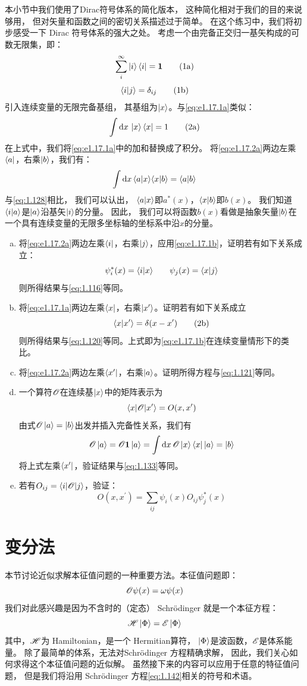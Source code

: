 { 本小节中我们使用了Dirac符号体系的简化版本，
 这种简化相对于我们的目的来说够用，
 但对矢量和函数之间的密切关系描述过于简单。
 在这个练习中，我们将初步感受一下 Dirac 符号体系的强大之处。
 考虑一个由完备正交归一基矢构成的可数无限集，即：
\[
     \sum_i^\infty \Ket{i}\Bra{i} = \mathbf{1}
     \tag{1a}\label{eq:e1.17.1a}
\]
\[
     \langle i \vert j \rangle = \delta_{ij}
     \tag{1b}\label{eq:e1.17.1b}
\]
引入连续变量的无限完备基组，
其基组为$\Ket{x}$。与\autoref{eq:e1.17.1a}类似：
\[
\int\mathrm{d}x\,\Ket{x}\Bra{x} = 1
\tag{2a}\label{eq:e1.17.2a}
\]
在上式中，我们将\autoref{eq:e1.17.1a}中的加和替换成了积分。
将\autoref{eq:e1.17.2a}两边左乘$\Bra{a}$，右乘$\Ket{b}$，我们有：
\[
\int\mathrm{d}x\, \langle a \vert x \rangle\langle x \vert b \rangle = \langle a \vert b \rangle
\]
与\autoref{eq:1.128}相比，
我们可以认出，
$\langle a \vert x \rangle$即$a^\ast(x)$，$\langle x \vert b \rangle$即$b(x)$。
我们知道$\langle i \vert a \rangle$是$\Ket{a}$沿基矢$\Ket{i}$的分量。
因此，
我们可以将函数$b(x)$看做是抽象矢量$\Ket{b}$在一个具有连续变量的无限多坐标轴的坐标系中沿$x$的分量。
\begin{enumerate}[a.]
 \item 将\autoref{eq:e1.17.2a}两边左乘$\Bra{i}$，右乘$\Ket{j}$，应用\autoref{eq:e1.17.1b}，证明若有如下关系成立：
 \[
 \psi^\ast_i(x) = \langle i \vert x \rangle \qquad \psi_j(x) = \langle x \vert j \rangle
 \]
 则所得结果与\autoref{eq:1.116}等同。
 \item 将\autoref{eq:e1.17.1a}两边左乘$\Bra{x}$，右乘$\Ket{x^\prime}$。证明若有如下关系成立
 \[
 \langle x \vert x^\prime \rangle = \delta(x - x^\prime)
 \tag{2b} \label{eq:e1.17.2b}
 \]
 则所得结果与\autoref{eq:1.120}等同。上式即为\autoref{eq:e1.17.1b}在连续变量情形下的类比。
 \item 将\autoref{eq:e1.17.2a}两边左乘$\Bra{x^\prime}$，右乘$\Ket{a}$。证明所得方程与\autoref{eq:1.121}等同。
 \item 一个算符$\mathscr{O}$在连续基$\Ket{x}$中的矩阵表示为
 \[\left\langle x\middle\vert \mathscr{O} \middle\vert x^\prime\right\rangle = O(x, x^\prime)\]
 由式$\mathscr{O}\Ket{a} = \Ket{b}$出发并插入完备性关系，我们有
 \[\mathscr{O}\Ket{a} = \mathscr{O}\mathbf{1}\Ket{a} = \int\mathrm{d}x\,\mathscr{O}\Ket{x}\Bra{x}\Ket{a} = \Ket{b}\]
 将上式左乘$\Bra{x^\prime}$，验证结果与\autoref{eq:1.133}等同。
 \item 若有$O_{ij} = \left\langle i\middle\vert \mathscr{O} \middle\vert j\right\rangle$，验证：
 \[O(x,x^\prime) = \sum_{ij}\psi_i(x)O_{ij}\psi_j^\ast(x)\]
\end{enumerate}
}


\section{变分法}
\label{sec:1.3}
本节讨论近似求解本征值问题的一种重要方法。本征值问题即：
\begin{equation}
 \mathscr{O}\psi(x) =\omega\psi(x)
 \label{eq:1.141}
\end{equation}
我们对此感兴趣是因为不含时的（定态） Schr\"{o}dinger 就是一个本征方程：
\begin{equation}
 \mathscr{H} \Ket{\Phi} = \mathscr{E} \Ket{\Phi}
 \label{eq:1.142}
\end{equation}
其中，$\mathscr{H}$为 Hamiltonian，是一个 Hermitian算符，
$\Ket{\Phi}$是波函数，$\mathscr{E}$是体系能量。
除了最简单的体系，无法对Schr\"odinger 方程精确求解，
因此，我们关心如何求得这个本征值问题的近似解。
虽然接下来的内容可以应用于任意的特征值问题，
但是我们将沿用 Schr\"odinger 方程\autoref{eq:1.142}相关的符号和术语。

